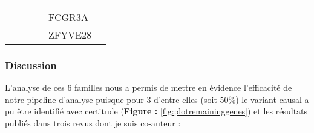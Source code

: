 \documentclass[12pt,twoside]{reedthesis}
\theoremstyle{definition}
\theoremstyle{definition}
\theoremstyle{remark}
\begin{document}
\begin{longtable}[]{@{}llllll@{}}
\begin{minipage}[t]{0.09\columnwidth}
  \strut
  \end{minipage}\tabularnewline
  \begin{minipage}[t]{0.08\columnwidth}\raggedright\strut
  \strut
  \end{minipage} & \begin{minipage}[t]{0.07\columnwidth}\raggedright\strut
  \strut
  \end{minipage} & \begin{minipage}[t]{0.16\columnwidth}\raggedright\strut
  \strut
  \end{minipage} & \begin{minipage}[t]{0.09\columnwidth}\raggedright\strut
  \strut
  \end{minipage} & \begin{minipage}[t]{0.09\columnwidth}\raggedright\strut
  FCGR3A\strut
  \end{minipage} & \begin{minipage}[t]{0.09\columnwidth}\raggedright\strut
  \strut
  \end{minipage}\tabularnewline
  \begin{minipage}[t]{0.08\columnwidth}\raggedright\strut
  \strut
  \end{minipage} & \begin{minipage}[t]{0.07\columnwidth}\raggedright\strut
  \strut
  \end{minipage} & \begin{minipage}[t]{0.16\columnwidth}\raggedright\strut
  \strut
  \end{minipage} & \begin{minipage}[t]{0.09\columnwidth}\raggedright\strut
  \strut
  \end{minipage} & \begin{minipage}[t]{0.09\columnwidth}\raggedright\strut
  ZFYVE28\strut
  \end{minipage} & \begin{minipage}[t]{0.09\columnwidth}\raggedright\strut
  \strut
  \end{minipage}\tabularnewline
  \bottomrule
  \end{longtable}
  
  \newpage 
  
  \subsubsection{Discussion}\label{discussion}
  
  L'analyse de ces 6 familles nous a permis de mettre en évidence
  l'efficacité de notre pipeline d'analyse puisque pour 3 d'entre elles
  (soit 50\%) le variant causal a pu être identifié avec certitude
  (\textbf{Figure : }\ref{fig:plotremaininggenes}) et les résultats
  publiés dans trois revus dont je suis co-auteur :
  
\end{document}
